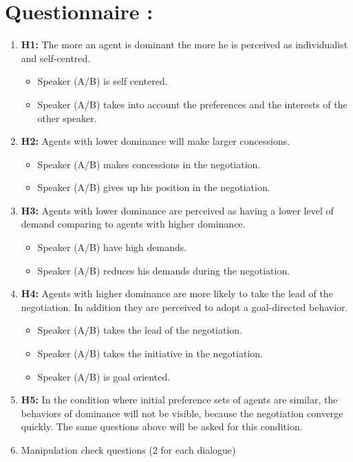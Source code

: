 \documentclass{article}
\begin{document}
	\section{Questionnaire :}
	
	
		\begin{enumerate}
			

		\item  \textbf{H1:} The more an agent is dominant the more he is perceived as individualist and self-centred.
				\begin{itemize}
				\item Speaker (A/B) is self centered.
				\item Speaker (A/B) takes into account the preferences and the interests of the other speaker. 
					\end{itemize}  
		
		\item \textbf{H2:} Agents with lower dominance will make larger concessions.
				\begin{itemize}
						\item Speaker (A/B) makes concessions in the negotiation.
						\item Speaker (A/B) gives up his position in the negotiation.
				\end{itemize} 
				
				
		\item \textbf{H3:} Agents with lower dominance are perceived as having a lower level of demand comparing to agents with higher dominance. 
				\begin{itemize}
						\item Speaker (A/B) have high demands.
						\item Speaker (A/B) reduces his demands during the negotiation.
				\end{itemize} 
				
				
		\item \textbf{H4:} Agents with higher dominance are more likely to take the lead of the negotiation. In addition they are perceived to adopt a goal-directed behavior. 
		\begin{itemize}
				\item Speaker (A/B) takes the lead of the negotiation.
				\item Speaker (A/B) takes the initiative in the negotiation. 
				\item Speaker (A/B) is goal oriented.
		\end{itemize}
		
		
		\item \textbf{H5:} In the condition where initial preference sets of agents are similar, the behaviors of dominance will not be visible, because the negotiation converge quickly.
			\subitem The same questions above will be asked for this condition. 
			
		\item Manipulation check questions (2 for each dialogue)
		
	\end{enumerate}
	
	
\end{document}
